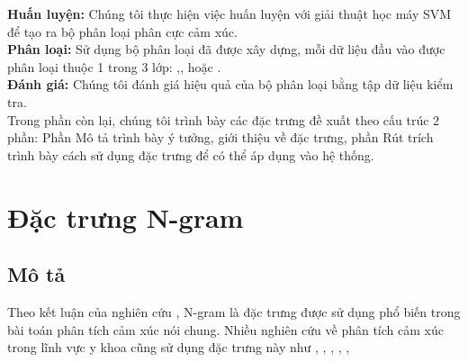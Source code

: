 \textbf{Huấn luyện:} Chúng tôi thực hiện việc huấn luyện với giải thuật học máy SVM để tạo ra bộ phân loại phân cực cảm xúc.\\

\textbf{Phân loại:} Sử dụng bộ phân loại đã được xây dựng, mỗi dữ liệu đầu vào được phân loại thuộc 1 trong 3 lớp: \tichcuc,\tieucuc, hoặc \trungtinh.\\

\textbf{Đánh giá:} Chúng tôi đánh giá hiệu quả của bộ phân loại bằng tập dữ liệu kiểm tra.\\

Trong phần còn lại, chúng tôi trình bày các đặc trưng đề xuất theo cấu trúc 2 phần: Phần Mô tả trình bày ý tưởng, giới thiệu về đặc trưng, phần Rút trích trình bày cách sử dụng đặc trưng để có thể áp dụng vào hệ thống.


\section{Đặc trưng N-gram} \label{sec:ngram}
\subsection*{Mô tả}
Theo kết luận của nghiên cứu \cite{chandrakala2012opinion}, N-gram là đặc trưng được sử dụng phổ biến trong bài toán phân tích cảm xúc nói chung. Nhiều nghiên cứu về phân tích cảm xúc trong lĩnh vực y khoa cũng sử dụng đặc trưng này như \cite{pang2002thumbs}, \cite{niu2005analysis}, \cite{sarker2011outcome}, \cite{niu2006using}, \cite{pestian2012sentie}, \cite{xia09improving} \\

